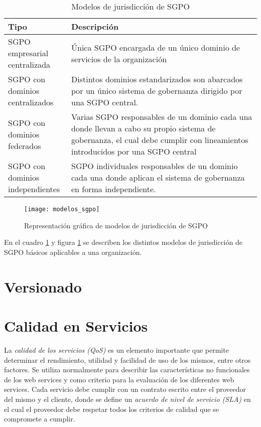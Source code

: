   \begin{table}[h]
    \begin{tabular}{p{0.25\linewidth} | p{0.75\linewidth}}
      \textbf{Tipo} & \textbf{Descripción} \\
      \hline
      SGPO empresarial centralizada & Única SGPO encargada de un único dominio de servicios de la organización\\
      \hline
      SGPO con dominios centralizados & Distintos dominios estandarizados son abarcados por un único sistema de gobernanza dirigido por una SGPO central.\\
      \hline
      SGPO con dominios federados & Varias SGPO responsables de un dominio cada una donde llevan a cabo su propio sistema de gobernanza, el cual debe cumplir con lineamientos introducidos por una SGPO central\\
      \hline
      SGPO con dominios independientes & SGPO individuales responsables de un dominio cada una donde aplican el sistema de gobernanza en forma independiente.\\
      \hline
    \end{tabular}
    \caption{Modelos de jurisdicción de SGPO}
    \label{tabla:modelos_sgpo}
  \end{table}

  \begin{figure}[h]
    \centering
    \texttt{[image: modelos\_sgpo]}
    \caption{Representación gráfica de modelos de jurisdicción de SGPO \cite{Erl:2011:SGG:1983453}}
    \label{imagen:modelos_sgpo}
  \end{figure}

  En el cuadro \ref{tabla:modelos_sgpo} y figura \ref{imagen:modelos_sgpo} se describen los distintos modelos de jurisdicción de SGPO básicos aplicables a una organización.

\section{Versionado}
\label{MarcoConceptual:versionado}

\section{Calidad en Servicios}
\label{MarcoConceptual:calidad}
La \emph{calidad de los servicios (QoS)} es un elemento importante que permite determinar el rendimiento, utilidad y facilidad de uso de los mismos, entre otros factores.
Se utiliza normalmente para describir las características no funcionales de los web services y como criterio para la evaluación de los diferentes web services.
Cada servicio debe cumplir con un contrato escrito entre el proveedor del mismo y el cliente, donde se define un \emph{acuerdo de nivel de servicio (SLA)} en el cual el proveedor debe respetar todos los criterios de calidad que se compromete a cumplir. \cite{Bool:QoSWS}

